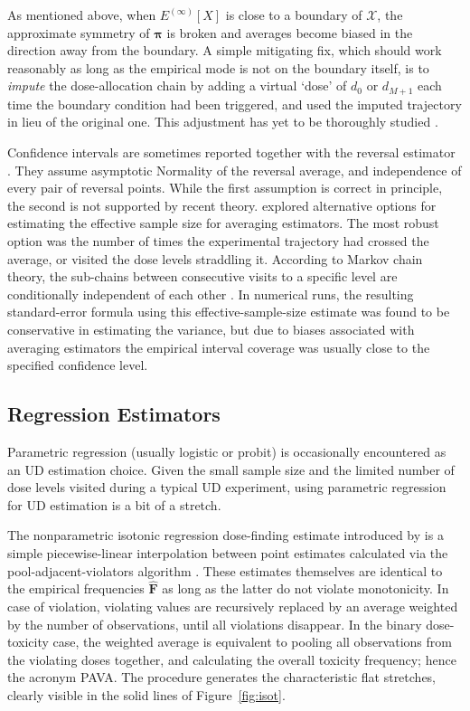 As mentioned above, when $E^{(\infty)}[X]$ is close to a boundary of $\mathcal{X}$, the approximate symmetry of $\boldsymbol{\pi}$ is broken and averages become biased in the direction away from the boundary. A simple mitigating fix, which should work reasonably as long as the empirical mode is not on the boundary itself, is to \emph{impute} the dose-allocation chain by adding a virtual `dose' of $d_0$ or $d_{M+1}$ each time the boundary condition had been triggered, and used the imputed trajectory in lieu of the original one. This adjustment has yet to be thoroughly studied \citep[Section~3.3]{Oron07}.

Confidence intervals are sometimes reported together with the reversal estimator \cite{Capo:Parp:Lyon:Colu:Cell:Mini:2001,Camo:Capo:Lyon:Colu:Epid:2004}. They assume asymptotic Normality of the reversal average, and independence of every pair of reversal points. While the first assumption is correct in principle, the second is not supported by recent theory. \citep[Section~3.3]{Oron07} explored alternative options for estimating the effective sample size for averaging estimators. The most robust option was the number of times the experimental trajectory had crossed the average, or visited the dose levels straddling it. According to Markov chain theory, the sub-chains between consecutive visits to a specific level are conditionally independent of each other \cite{Tsut:rand:1967}. In numerical runs, the resulting standard-error formula using this effective-sample-size estimate was found to be conservative in estimating the variance, but due to biases associated with averaging estimators the empirical interval coverage was usually close to the specified confidence level.

\subsection{Regression Estimators}

Parametric regression (usually logistic or probit) is occasionally encountered as an UD estimation choice. Given the small sample size and the limited number of dose levels visited during a typical UD experiment, using parametric regression for UD estimation is a bit of a stretch.

The nonparametric isotonic regression dose-finding estimate introduced by \citep{Styl:Flou:dose:2002} is a simple piecewise-linear interpolation between point estimates calculated via the pool-adjacent-violators algorithm \citep[PAVA,][]{BBBB:order:1972}. These estimates themselves are identical to the empirical frequencies $\mathbf{\hat{F}}$ as long as the latter do not violate monotonicity. In case of violation, violating values are recursively replaced by an average weighted by the number of observations, until all violations disappear. In the binary dose-toxicity case, the weighted average is equivalent to pooling all observations from the violating doses together, and calculating the overall toxicity frequency; hence the acronym PAVA. The procedure generates the characteristic flat stretches, clearly visible in the solid lines of Figure~\ref{fig:isot}.

